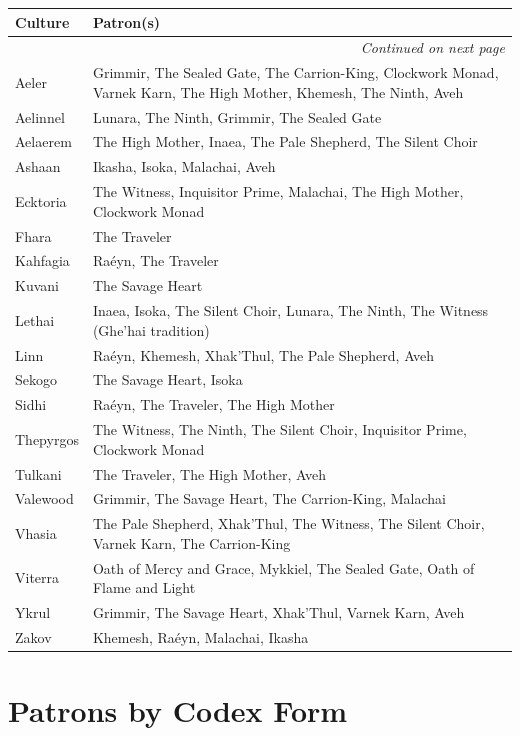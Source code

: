 \begin{longtable}{|p{4cm}|p{12cm}|}
\hline
\textbf{Culture} & \textbf{Patron(s)} \\
\hline
\endhead
\hline
\multicolumn{2}{|r|}{\textit{Continued on next page}} \\
\endfoot
\hline
\endlastfoot
Aeler & Grimmir, The Sealed Gate, The Carrion-King, Clockwork Monad, Varnek Karn, The High Mother, Khemesh, The Ninth, Aveh \\
Aelinnel & Lunara, The Ninth, Grimmir, The Sealed Gate \\
Aelaerem & The High Mother, Inaea, The Pale Shepherd, The Silent Choir \\
Ashaan & Ikasha, Isoka, Malachai, Aveh \\
Ecktoria & The Witness, Inquisitor Prime, Malachai, The High Mother, Clockwork Monad \\
Fhara & The Traveler \\
Kahfagia & Raéyn, The Traveler \\
Kuvani & The Savage Heart \\
Lethai & Inaea, Isoka, The Silent Choir, Lunara, The Ninth, The Witness (Ghe'hai tradition) \\
Linn & Raéyn, Khemesh, Xhak'Thul, The Pale Shepherd, Aveh \\
Sekogo & The Savage Heart, Isoka \\
Sidhi & Raéyn, The Traveler, The High Mother \\
Thepyrgos & The Witness, The Ninth, The Silent Choir, Inquisitor Prime, Clockwork Monad \\
Tulkani & The Traveler, The High Mother, Aveh \\
Valewood & Grimmir, The Savage Heart, The Carrion-King, Malachai \\
Vhasia & The Pale Shepherd, Xhak'Thul, The Witness, The Silent Choir, Varnek Karn, The Carrion-King \\
Viterra & Oath of Mercy and Grace, Mykkiel, The Sealed Gate, Oath of Flame and Light \\
Ykrul & Grimmir, The Savage Heart, Xhak'Thul, Varnek Karn, Aveh \\
Zakov & Khemesh, Raéyn, Malachai, Ikasha \\
\hline
\end{longtable}

\section{Patrons by Codex Form}

